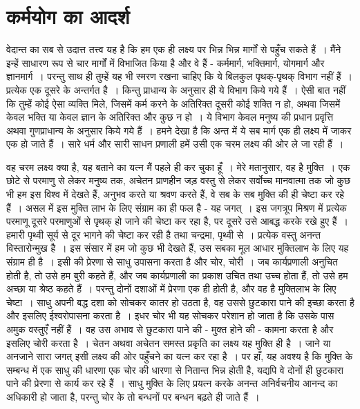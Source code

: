 
\chapter{कर्मयोग का आदर्श}

वेदान्त का सब से उदात्त तत्त्व यह है कि हम एक ही लक्ष्य पर भिन्न भिन्न मार्गों से पहुँच सकते हैं~। मैंने इन्हें साधारण रूप से चार मार्गों में विभाजित किया है और वे हैं - कर्ममार्ग, भक्तिमार्ग, योगमार्ग और ज्ञानमार्ग~। परन्तु साथ ही तुम्हें यह भी स्मरण रखना चाहिए कि ये बिलकुल पृथक्-पृथक् विभाग नहीं हैं~। प्रत्येक एक दूसरे के अन्तर्गत है~। किन्तु प्राधान्य के अनुसार ही ये विभाग किये गये हैं~। ऐसी बात नहीं कि तुम्हें कोई ऐसा व्यक्ति मिले, जिसमें कर्म करने के अतिरिक्त दूसरी कोई शक्ति न हो, अथवा जिसमें केवल भक्ति या केवल ज्ञान के अतिरिक्त और कुछ न हो~। ये विभाग केवल मनुष्य की प्रधान प्रवृत्ति अथवा गुणप्राधान्य के अनुसार किये गये हैं~। हमने देखा है कि अन्त में ये सब मार्ग एक ही लक्ष्य में जाकर एक हो जाते हैं~। सारे धर्म और सारी साधन प्रणाली हमें उसी एक चरम लक्ष्य की ओर ले जा रही हैं~।

वह चरम लक्ष्य क्या है, यह बताने का यत्न मैं पहले ही कर चुका हूँ~। मेरे मतानुसार, वह है मुक्ति~। एक छोटे से परमाणु से लेकर मनुष्य तक, अचेतन प्राणहीन जड़ वस्तु से लेकर सर्वोच्च मानवात्मा तक जो कुछ भी हम इस विश्व में देखते हैं, अनुभव करते या श्रवण करते हैं, वे सब के सब मुक्ति की ही चेष्टा कर रहे हैं~। असल में इस मुक्ति लाभ के लिए संग्राम का ही फल है - यह जगत्~। इस जगत्रूप मिश्रण में प्रत्येक परमाणू दूसरे परमाणुओं से पृथक् हो जाने की चेष्टा कर रहा है, पर दूसरे उसे आबद्ध करके रखे हुए हैं~। हमारी पृथ्वी सूर्य से दूर भागने की चेष्टा कर रही है तथा चन्द्रमा, पृथ्वी से~। प्रत्येक वस्तु अनन्त विस्तारोन्मुख है~। इस संसार में हम जो कुछ भी देखते हैं, उस सबका मूल आधार मुक्तिलाभ के लिए यह संग्राम ही है~। इसी की प्रेरणा से साधु उपासना करता है और चोर, चोरी~। जब कार्यप्रणाली अनुचित होती है, तो उसे हम बुरी कहते हैं, और जब कार्यप्रणाली का प्रकाश उचित तथा उच्च होता हैं, तो उसे हम अच्छा या श्रेष्ठ कहते हैं~। परन्तु दोनों दशाओं में प्रेरणा एक ही होती है, और वह है मुक्तिलाभ के लिए चेष्टा~। साधु अपनी बद्ध दशा को सोचकर कातर हो उठता है, वह उससे छुटकारा पाने की इच्छा करता है और इसलिए ईश्वरोपासना करता है~। इधर चोर भी यह सोचकर परेशान हो जाता है कि उसके पास अमुक वस्तुएँ नहीं हैं~। वह उस अभाव से छुटकारा पाने की - मुक्त होने की - कामना करता है और इसलिए चोरी करता है~। चेतन अथवा अचेतन समस्त प्रकृति का लक्ष्य यह मुक्ति ही है~। जाने या अनजाने सारा जगत् इसी लक्ष्य की ओर पहुँचने का यत्न कर रहा है~। पर हाँ, यह अवश्य है कि मुक्ति के सम्बन्ध में एक साधु की धारणा एक चोर की धारणा से नितान्त भिन्न होती है, यद्यपि वे दोनों ही छुटकारा पाने की प्रेरणा से कार्य कर रहे हैं~। साधु मुक्ति के लिए प्रयत्न करके अनन्त अनिर्वचनीय आनन्द का अधिकारी हो जाता है, परन्तु चोर के तो बन्धनों पर बन्धन बढ़ते ही जाते हैं~।

